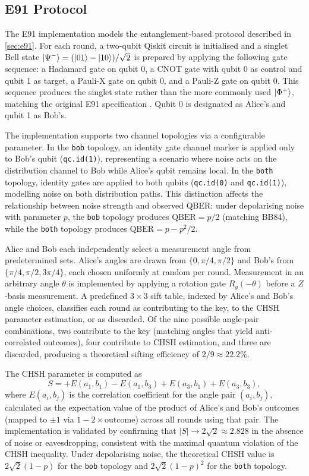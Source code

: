 \documentclass[10pt, a4paper]{report}
\begin{document}
\subsection{E91 Protocol}

The E91 implementation models the entanglement-based protocol described in \cref{sec:e91}. For each round, a two-qubit Qiskit circuit is initialised and a singlet Bell state $\ket{\Psi^{-}} = (\ket{01} - \ket{10})/\sqrt{2}$ is prepared by applying the following gate sequence: a Hadamard gate on qubit 0, a CNOT gate with qubit 0 as control and qubit 1 as target, a Pauli-X gate on qubit 0, and a Pauli-Z gate on qubit 0. This sequence produces the singlet state rather than the more commonly used $\ket{\Phi^+}$, matching the original E91 specification \cite{E91}. Qubit 0 is designated as Alice's and qubit 1 as Bob's.

The implementation supports two channel topologies via a configurable parameter. In the \texttt{bob} topology, an identity gate channel marker is applied only to Bob's qubit (\texttt{qc.id(1)}), representing a scenario where noise acts on the distribution channel to Bob while Alice's qubit remains local. In the \texttt{both} topology, identity gates are applied to both qubits (\texttt{qc.id(0)} and \texttt{qc.id(1)}), modelling noise on both distribution paths. This distinction affects the relationship between noise strength and observed QBER: under depolarising noise with parameter $p$, the \texttt{bob} topology produces $\text{QBER} = p/2$ (matching BB84), while the \texttt{both} topology produces $\text{QBER} = p - p^2/2$.

Alice and Bob each independently select a measurement angle from predetermined sets. Alice's angles are drawn from $\{0, \pi/4, \pi/2\}$ and Bob's from $\{\pi/4, \pi/2, 3\pi/4\}$, each chosen uniformly at random per round. Measurement in an arbitrary angle $\theta$ is implemented by applying a rotation gate $R_y(-\theta)$ before a $Z$-basis measurement. A predefined $3 \times 3$ sift table, indexed by Alice's and Bob's angle choices, classifies each round as contributing to the key, to the CHSH parameter estimation, or as discarded. Of the nine possible angle-pair combinations, two contribute to the key (matching angles that yield anti-correlated outcomes), four contribute to CHSH estimation, and three are discarded, producing a theoretical sifting efficiency of $2/9 \approx 22.2\%$.

The CHSH parameter is computed as
%
\begin{equation}
\label{eq:chsh-computation}
S = +E(a_1, b_1) - E(a_1, b_3) + E(a_3, b_1) + E(a_3, b_3),
\end{equation}
%
where $E(a_i, b_j)$ is the correlation coefficient for the angle pair $(a_i, b_j)$, calculated as the expectation value of the product of Alice's and Bob's outcomes (mapped to $\pm 1$ via $1 - 2 \times \text{outcome}$) across all rounds using that pair. The implementation is validated by confirming that $|S| \rightarrow 2\sqrt{2} \approx 2.828$ in the absence of noise or eavesdropping, consistent with the maximal quantum violation of the CHSH inequality. Under depolarising noise, the theoretical CHSH value is $2\sqrt{2}(1-p)$ for the \texttt{bob} topology and $2\sqrt{2}(1-p)^2$ for the \texttt{both} topology.
\end{document}
